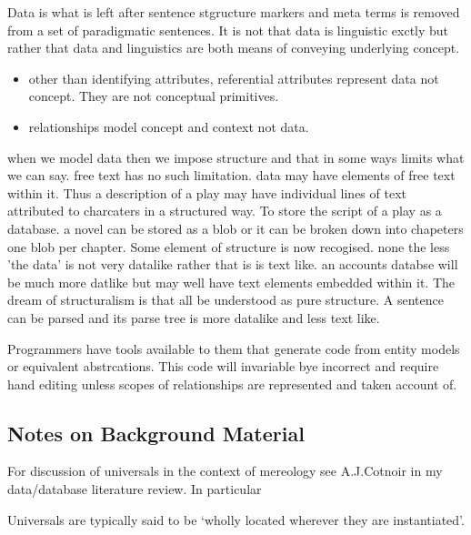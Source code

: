\begin{noteforfuture}
Data is what is left after sentence stgructure markers and meta terms is removed from a set of paradigmatic sentences. It is not that data is linguistic exctly but rather that data and linguistics are both means of conveying underlying concept.

\end{noteforfuture}

\begin{noteforfuture}
\begin{itemize}
\item other than identifying attributes, referential attributes represent data not concept. They are not conceptual primitives.
\item relationships model concept and context not data. 
\end{itemize}
\end{noteforfuture}

\begin{noteforfuture}
when we model data then we impose structure and that in some ways limits what we can say.
free text has no such limitation.
data may have elements of free text within it. Thus a description of a play may have individual lines of text attributed to charcaters in a structured way. To store the script of a play as a database. a novel can be stored as a blob or it can be broken down into chapeters one blob per chapter. Some element of structure is now recogised. none the less 'the data' is not very datalike rather that is is text like. an accounts databse will be much more datlike but may well have text elements embedded within it. The dream of structuralism is that all be understood as pure structure. A sentence can be parsed and its parse tree is more datalike and less text like.
\end{noteforfuture}

\begin{noteforfuture}
Programmers have tools available to them that generate code from entity models 
or equivalent abstrcations. This code will invariable bye incorrect and require hand editing unless scopes of relationships are represented and taken account of.
\end{noteforfuture}

\subsection{Notes on Background Material}
\begin{noteforfuture}
For discussion of universals in  the context of mereology see A.J.Cotnoir in my data/database literature review. In particular
\begin{erquote}
Universals are typically said to be ‘wholly located wherever they are instantiated’.
\end{erquote}
\end{noteforfuture}

